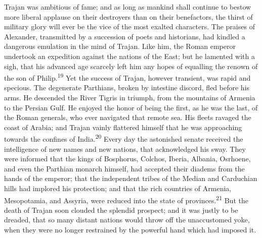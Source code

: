



Trajan was ambitious of fame; and as long as mankind shall
continue to bestow more liberal applause on their destroyers than
on their benefactors, the thirst of military glory will ever be
the vice of the most exalted characters. The praises of
Alexander, transmitted by a succession of poets and historians,
had kindled a dangerous emulation in the mind of Trajan. Like
him, the Roman emperor undertook an expedition against the
nations of the East; but he lamented with a sigh, that his
advanced age scarcely left him any hopes of equalling the renown
of the son of Philip.\textsuperscript{19} Yet the success of Trajan, however
transient, was rapid and specious. The degenerate Parthians,
broken by intestine discord, fled before his arms. He descended
the River Tigris in triumph, from the mountains of Armenia to the
Persian Gulf. He enjoyed the honor of being the first, as he was
the last, of the Roman generals, who ever navigated that remote
sea. His fleets ravaged the coast of Arabia; and Trajan vainly
flattered himself that he was approaching towards the confines of
India.\textsuperscript{20} Every day the astonished senate received the
intelligence of new names and new nations, that acknowledged his
sway. They were informed that the kings of Bosphorus, Colchos,
Iberia, Albania, Osrhoene, and even the Parthian monarch himself,
had accepted their diadems from the hands of the emperor; that
the independent tribes of the Median and Carduchian hills had
implored his protection; and that the rich countries of Armenia,
Mesopotamia, and Assyria, were reduced into the state of
provinces.\textsuperscript{21} But the death of Trajan soon clouded the splendid
prospect; and it was justly to be dreaded, that so many distant
nations would throw off the unaccustomed yoke, when they were no
longer restrained by the powerful hand which had imposed it.




